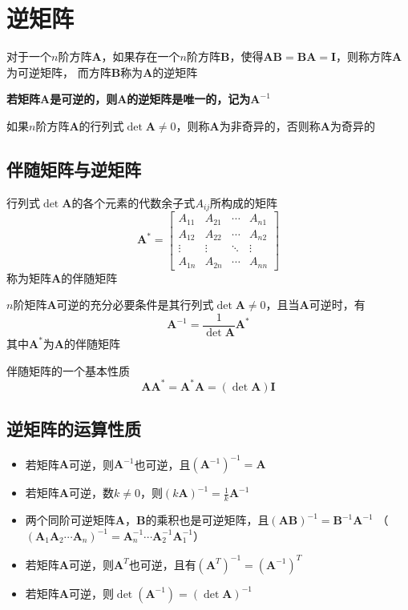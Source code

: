 \documentclass[UTF8]{ctexart}
\newcommand{\ve}[1]{{\bm{#1}}}
\newcommand{\mat}[1]{\ve{#1}}
\newcommand{\emplin}{\vspace{1em}}
\begin{document}
\section*{逆矩阵}

对于一个$n$阶方阵$\mat{A}$，如果存在一个$n$阶方阵$\mat{B}$，使得$\mat{A}\mat{B}=\mat{B}\mat{A}=\mat{I}$，则称方阵$\mat{A}$为可逆矩阵，
而方阵$\mat{B}$称为$\mat{A}$的逆矩阵

\textbf{若矩阵$\mat{A}$是可逆的，则$\mat{A}$的逆矩阵是唯一的，记为$\mat{A}^{-1}$}

\emplin

如果$n$阶方阵$\mat{A}$的行列式$\det\mat{A}\ne0$，则称$\mat{A}$为非奇异的，否则称$\mat{A}$为奇异的

\subsection*{伴随矩阵与逆矩阵}

行列式$\det\mat{A}$的各个元素的代数余子式$A_{ij}$所构成的矩阵
\[\mat{A}^*=\begin{bmatrix}
A_{11}&A_{21}&\cdots&A_{n1}\\
A_{12}&A_{22}&\cdots&A_{n2}\\
\vdots&\vdots&\ddots&\vdots\\
A_{1n}&A_{2n}&\cdots&A_{nn}
\end{bmatrix}\]
称为矩阵$\mat{A}$的伴随矩阵

\emplin

$n$阶矩阵$\mat{A}$可逆的充分必要条件是其行列式$\det\mat{A}\ne0$，且当$\mat{A}$可逆时，有
\[\mat{A}^{-1}=\frac{1}{\det\mat{A}}\mat{A}^*\]
其中$\mat{A}^*$为$\mat{A}$的伴随矩阵

\emplin

伴随矩阵的一个基本性质
\[\mat{A}\mat{A}^*=\mat{A}^*\mat{A}=(\det\mat{A})\mat{I}\]

\subsection*{逆矩阵的运算性质}

\begin{itemize}
  \item 若矩阵$\mat{A}$可逆，则$\mat{A}^{-1}$也可逆，且$(\mat{A}^{-1})^{-1}=\mat{A}$
  \item 若矩阵$\mat{A}$可逆，数$k\ne0$，则$(k\mat{A})^{-1}=\frac{1}{k}\mat{A}^{-1}$
  \item 两个同阶可逆矩阵$\mat{A}$，$\mat{B}$的乘积也是可逆矩阵，且$(\mat{A}\mat{B})^{-1}=\mat{B}^{-1}\mat{A}^{-1}$
  （$(\mat{A}_1\mat{A}_2\cdots\mat{A}_n)^{-1}=\mat{A}_n^{-1}\cdots\mat{A}_2^{-1}\mat{A}_1^{-1}$）
  \item 若矩阵$\mat{A}$可逆，则$\mat{A}^T$也可逆，且有$(\mat{A}^T)^{-1}=(\mat{A}^{-1})^T$
  \item 若矩阵$\mat{A}$可逆，则$\det(\mat{A}^{-1})=(\det\mat{A})^{-1}$
\end{itemize}
\end{document}
